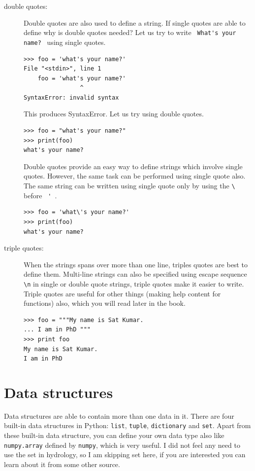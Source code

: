 \documentclass[10pt]{book}
\begin{document}
{\begin{description}
\item[double quotes:] Double quotes are also used to define a string. If single quotes are able to define why is double quotes needed? Let us try to write \verb" What's your name? " using single quotes.
\beforeverb
\begin{verbatim}
>>> foo = 'what's your name?'
File "<stdin>", line 1
    foo = 'what's your name?'
                ^
SyntaxError: invalid syntax
\end{verbatim}
\afterverb
This produces SyntaxError. Let us try using double quotes.

\beforeverb
\begin{verbatim}
>>> foo = "what's your name?"
>>> print(foo)
what's your name?
\end{verbatim}
\afterverb
Double quotes provide an easy way to define strings which involve single quotes. However, the same task can be performed using single quote also. The same string can be written using single quote only by using the \verb"\" before \verb" ' ". 
\beforeverb \begin{verbatim}
>>> foo = 'what\'s your name?'
>>> print(foo)
what's your name?
\end{verbatim} \afterverb

\item[triple quotes:]  When the strings spans over more than one line, triples quotes are best to define them. Multi-line strings can also be specified using escape sequence \verb"\n" in single or double quote strings, triple quotes make it easier to write. Triple quotes are useful for other things (making help content for functions) also, which you will read later in the book.
\beforeverb
\begin{verbatim}
>>> foo = """My name is Sat Kumar.
... I am in PhD """
>>> print foo
My name is Sat Kumar.
I am in PhD 
\end{verbatim}
\afterverb

\end{description}

\section{Data structures}
Data structures are able to contain more than one data in it. There are four built-in data structures in Python: {\tt list}, {\tt tuple}, {\tt dictionary} and {\tt set}. Apart from these built-in data structure, you can define your own data type also like {\tt numpy.array} defined by {\tt numpy}, which is very useful. I did not feel any need to use the set in hydrology, so I am skipping set here, if you are interested you can learn about it from some other source. 
}
\end{document}
